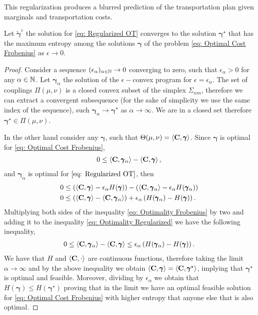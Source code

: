 This regularization produces a blurred prediction of the transportation plan given marginals and transportation costs.
\begin{theorem}
	Let $\tilde{\pmb{\gamma}}^{\epsilon}$ the solution for \eqref{eq: Regularized OT} converges to the solution $\pmb{\gamma}^\star$ that has the maximum entropy among the solutions $\pmb{\gamma}$ of the problem \eqref{eq: Optimal Cost Frobenius}  as $\epsilon\rightarrow 0$.
\end{theorem}
\begin{proof}
	Consider a sequence $(\epsilon_\alpha)_{\alpha\in\mathbb{N}} \to 0$ converging to zero, such that $\epsilon_\alpha>0$ for any $\alpha\in\mathbb{N}$. Let $\pmb{\gamma}_\alpha$ the solution of the $\epsilon-$convex program for $\epsilon=\epsilon_\alpha$. The set of couplings $\Pi(\mu,\nu)$ is a closed convex subset of the simplex $\Sigma_{nm}$, therefore we can extract a convergent subsequence (for the sake of simplicity we use the same index of the sequence), such  $\pmb{\gamma}_{\alpha}\rightarrow \pmb{\gamma}^\star$ as $\alpha\rightarrow \infty$.  We are in a closed set therefore $\pmb{\gamma}^\star\in \Pi(\mu,\nu)$. 
	
	In the other hand consider any $\pmb{\gamma}$, such that $\Theta(\mu, \nu)=\left\langle \mathbf{C},\pmb{\gamma} \right\rangle$. Since $\pmb{\gamma}$ is optimal for \eqref{eq: Optimal Cost Frobenius},
	\begin{align}
	0\leq \left\langle \mathbf{C},\pmb{\gamma}_\alpha \right\rangle-\left\langle \mathbf{C},\pmb{\gamma} \right\rangle \label{eq: Optimality Frobenius},
	\end{align}
	and $\pmb{\gamma}_\alpha$ is optimal for $\eqref{eq: Regularized OT}$, then
	\begin{align}
		0&\leq \left( \left\langle \mathbf{C},\pmb{\gamma} \right\rangle-\epsilon_\alpha H(\pmb{\gamma}) \right)-\left( \left\langle \mathbf{C},\pmb{\gamma}_\alpha \right\rangle-\epsilon_\alpha H(\pmb{\gamma}_\alpha) \right)\nonumber\\
		0&\leq \left( \left\langle \mathbf{C},\pmb{\gamma} \right\rangle-\left\langle \mathbf{C},\pmb{\gamma}_\alpha \right\rangle \right)+\epsilon_\alpha\left(  H(\pmb{\gamma}_\alpha)- H(\pmb{\gamma}) \right) \label{eq: Optimality Regularized}.
	\end{align}
	Multiplying both sides of the inequality \eqref{eq: Optimality Frobenius} by two and adding it to the inequality \eqref{eq: Optimality Regularized} we have the following inequality,
	\begin{align}
		0\leq \left\langle \mathbf{C},\pmb{\gamma}_\alpha \right\rangle-\left\langle \mathbf{C},\pmb{\gamma} \right\rangle\leq \epsilon_\alpha\left( H(\pmb{\gamma}_\alpha)-H(\pmb{\gamma}) \right).
	\end{align}
	We have that $H$ and $\left\langle \mathbf{C}, \cdot \right\rangle$ are continuous functions, therefore taking the limit $\alpha\rightarrow \infty$ and by the above inequality we obtain $\left\langle \mathbf{C},\pmb{\gamma} \right\rangle= \left\langle \mathbf{C},\pmb{\gamma}^\star \right\rangle$, implying that $\pmb{\gamma}^\star$ is optimal and feasible. Moreover, dividing by $\epsilon_\alpha$ we obtain that $H(\pmb{\gamma})\leq H(\pmb{\gamma}^\star)$ proving that in the limit we have an optimal feasible solution for \eqref{eq: Optimal Cost Frobenius} with higher entropy that anyone else that is also optimal.
	\end{proof}
